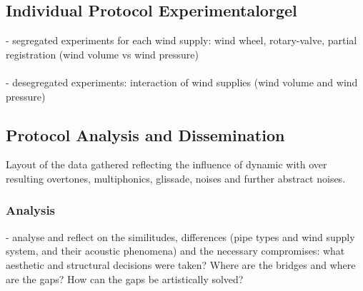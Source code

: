 \subsection{Individual Protocol Experimentalorgel}

- segregated experiments for each wind supply: wind wheel, rotary-valve, partial registration (wind volume vs wind pressure)\\
\\
- desegregated experiments: interaction of wind supplies (wind volume and wind pressure)

\subsection{Protocol Analysis and Dissemination}

Layout of the data gathered reflecting the influence of dynamic with over resulting overtones, multiphonics, glissade, noises and further  abstract noises. 

\subsubsection{Analysis}

- analyse and reflect on the similitudes, differences (pipe types and wind supply system, and their acoustic phenomena) and the necessary compromises: what aesthetic and structural decisions were taken? Where are the bridges and where are the gaps? How can the gaps be artistically solved?\\
\\



